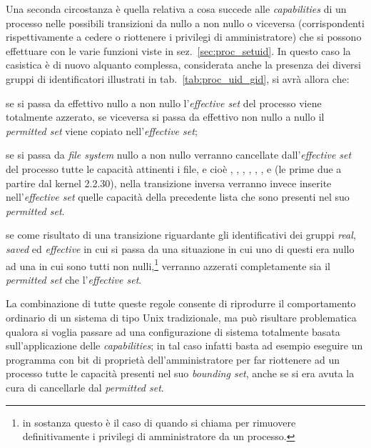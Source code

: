 Una seconda circostanza è quella relativa a cosa succede alle
\textit{capabilities} di un processo nelle possibili transizioni da 
nullo a  non nullo o viceversa (corrispondenti rispettivamente a
cedere o riottenere i privilegi di amministratore) che si possono effettuare
con le varie funzioni viste in sez.~\ref{sec:proc_setuid}. In questo caso la
casistica è di nuovo alquanto complessa, considerata anche la presenza dei
diversi gruppi di identificatori illustrati in tab.~\ref{tab:proc_uid_gid}, si
avrà allora che:
\begin{enumerate*}
\item se si passa da  effettivo nullo a non nullo
  l'\textit{effective set} del processo viene totalmente azzerato, se
  viceversa si passa da  effettivo non nullo a nullo il
  \textit{permitted set} viene copiato nell'\textit{effective set};
\item se si passa da \textit{file system}  nullo a non nullo verranno
  cancellate dall'\textit{effective set} del processo tutte le capacità
  attinenti i file, e cioè , ,
  , ,
  , ,  e
   (le prime due a partire dal kernel 2.2.30), nella
  transizione inversa verranno invece inserite nell'\textit{effective set}
  quelle capacità della precedente lista che sono presenti nel suo
  \textit{permitted set}.
\item se come risultato di una transizione riguardante gli identificativi dei
  gruppi \textit{real}, \textit{saved} ed \textit{effective} in cui si passa
  da una situazione in cui uno di questi era nullo ad una in cui sono tutti
  non nulli,\footnote{in sostanza questo è il caso di quando si chiama
     per rimuovere definitivamente i privilegi di amministratore
    da un processo.} verranno azzerati completamente sia il \textit{permitted
    set} che l'\textit{effective set}.
\end{enumerate*}
\label{sec:capability-uid-transition}

La combinazione di tutte queste regole consente di riprodurre il comportamento
ordinario di un sistema di tipo Unix tradizionale, ma può risultare
problematica qualora si voglia passare ad una configurazione di sistema
totalmente basata sull'applicazione delle \textit{capabilities}; in tal caso
infatti basta ad esempio eseguire un programma con  bit di proprietà
dell'amministratore per far riottenere ad un processo tutte le capacità
presenti nel suo \textit{bounding set}, anche se si era avuta la cura di
cancellarle dal \textit{permitted set}.

